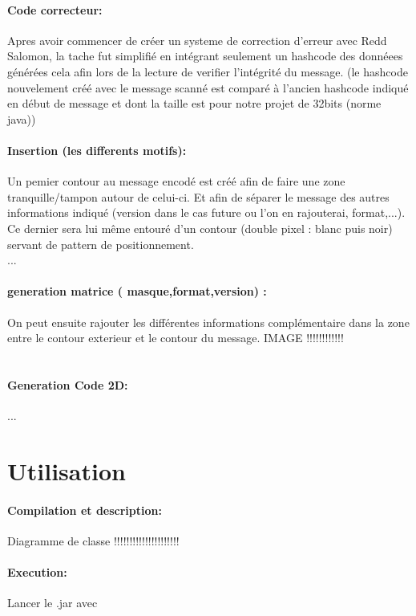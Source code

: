 \documentclass{article}
\begin{document}
\subsection{Code correcteur:}
Apres avoir commencer de créer un systeme de correction d'erreur avec Redd Salomon, la tache fut simplifié en intégrant seulement un hashcode des donnéees générées cela afin lors de la lecture de verifier l'intégrité du message. (le hashcode nouvelement créé avec le message scanné est comparé à l'ancien hashcode indiqué en début de message et dont la taille est pour notre projet de 32bits (norme java))
\\
\subsection{Insertion (les differents motifs):}
Un pemier contour au message encodé est créé afin de faire une zone tranquille/tampon autour de celui-ci. Et afin de séparer le message des autres informations indiqué (version dans le cas future ou l'on en rajouterai, format,...). Ce dernier sera lui même entouré d'un contour (double pixel : blanc puis noir) servant de pattern de positionnement.\\
...
\\
\subsection{ generation matrice ( masque,format,version) :}
On peut ensuite rajouter les différentes informations complémentaire dans la zone entre le contour exterieur et le contour du message.
IMAGE !!!!!!!!!!!!\\
\\
\subsection{Generation Code 2D:}
...
\\

\part{Utilisation}
\subsection{Compilation et description:}
Diagramme de classe !!!!!!!!!!!!!!!!!!!!!
\subsection{Execution:}
Lancer le .jar avec
\end{document}
